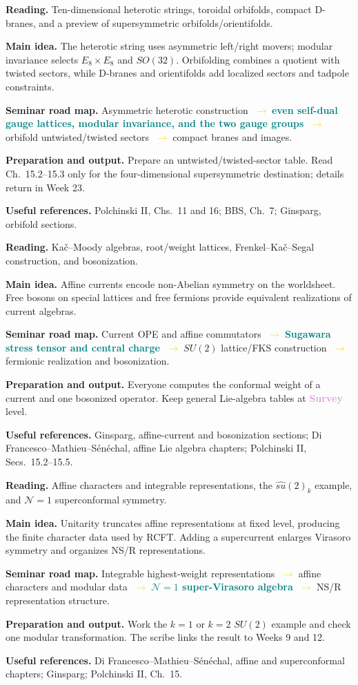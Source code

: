 \documentclass[11pt]{article}
\newcommand{\survey}{\textcolor{plum}{\textbf{Survey}}}
\newcommand{\essential}[1]{\textcolor{teal}{\textbf{#1}}}
\newcommand{\roadarrow}{\textcolor{gold}{\ensuremath{\;\longrightarrow\;}}}
\newcommand{\seminarweek}[7]{%
  \begin{tcolorbox}[
    enhanced,
    colback=white,colframe=navy,
    boxrule=0.65pt,arc=1.5mm,
    left=3mm,right=3mm,top=2mm,bottom=2mm,
    title={#1\hfill\normalfont #2},
    fonttitle=\bfseries,coltitle=white,colbacktitle=navy
  ]
  \textbf{Reading.} #3

  \textbf{Main idea.} #4

  \textbf{Seminar road map.} #5

  \textbf{Preparation and output.} #6

  \textbf{Useful references.} #7
  \end{tcolorbox}
}
\begin{document}
\seminarweek{Week 16}{Ch.~10.4--10.6, pp.~284--320; preview 15.2--15.3}
{Ten-dimensional heterotic strings, toroidal orbifolds, compact D-branes, and a
preview of supersymmetric orbifolds/orientifolds.}
{The heterotic string uses asymmetric left/right movers; modular invariance
selects $E_8\times E_8$ and $SO(32)$.  Orbifolding combines a quotient with
twisted sectors, while D-branes and orientifolds add localized sectors and
tadpole constraints.}
{Asymmetric heterotic construction \roadarrow \essential{even self-dual gauge
lattices, modular invariance, and the two gauge groups} \roadarrow orbifold
untwisted/twisted sectors \roadarrow compact branes and images.}
{Prepare an untwisted/twisted-sector table.  Read Ch.~15.2--15.3 only for the
four-dimensional supersymmetric destination; details return in Week 23.}
{Polchinski II, Chs.~11 and 16; BBS, Ch.~7; Ginsparg, orbifold sections.}

\seminarweek{Week 17}{Ch.~11.1--11.4, pp.~321--342}
{Ka\v{c}--Moody algebras, root/weight lattices, Frenkel--Ka\v{c}--Segal
construction, and bosonization.}
{Affine currents encode non-Abelian symmetry on the worldsheet.  Free bosons on
special lattices and free fermions provide equivalent realizations of current
algebras.}
{Current OPE and affine commutators \roadarrow \essential{Sugawara stress
tensor and central charge} \roadarrow $SU(2)$ lattice/FKS construction
\roadarrow fermionic realization and bosonization.}
{Everyone computes the conformal weight of a current and one bosonized operator.
Keep general Lie-algebra tables at \survey{} level.}
{Ginsparg, affine-current and bosonization sections; Di
Francesco--Mathieu--S\'en\'echal, affine Lie algebra chapters; Polchinski II,
Secs.~15.2--15.5.}

\seminarweek{Week 18}{Ch.~11.5--11.6; 12.1, pp.~343--369}
{Affine characters and integrable representations, the $\widehat{su}(2)_k$
example, and $\mathcal N=1$ superconformal symmetry.}
{Unitarity truncates affine representations at fixed level, producing the finite
character data used by RCFT.  Adding a supercurrent enlarges Virasoro symmetry
and organizes NS/R representations.}
{Integrable highest-weight representations \roadarrow affine characters and
modular data \roadarrow \essential{$\mathcal N=1$ super-Virasoro algebra}
\roadarrow NS/R representation structure.}
{Work the $k=1$ or $k=2$ $SU(2)$ example and check one modular transformation.
The scribe links the result to Weeks 9 and 12.}
{Di Francesco--Mathieu--S\'en\'echal, affine and superconformal chapters;
Ginsparg; Polchinski II, Ch.~15.}
\end{document}
